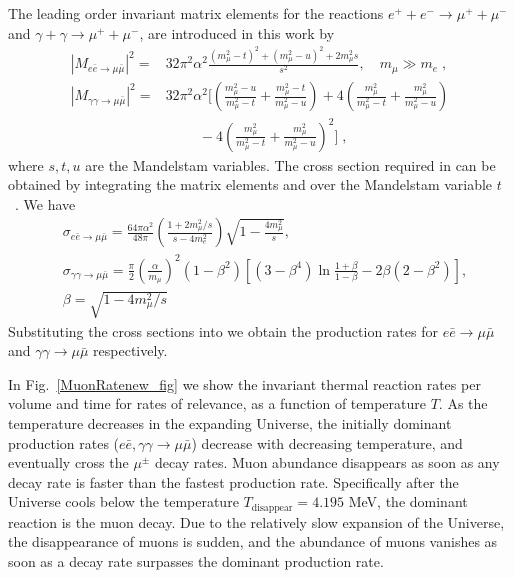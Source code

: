 The leading order invariant matrix elements for the reactions $e^++e^-\to\mu^++\mu^-$ and $\gamma+\gamma\to\mu^++\mu^-$, are introduced in this work by \cite{Kuznetsova:2008jt}
\begin{align}\label{Mee}
|M_{e\bar e\to\mu\bar\mu}|^2=&32\pi^2\alpha^2\frac{(m_\mu^2-t)^2+(m_\mu^2-u)^2+2m_\mu^2s}{s^2},\quad m_\mu\gg m_e\;,\\[0.2cm]
\label{Mgg}
|M_{\gamma\gamma\to\mu\bar\mu}|^2=&32\pi^2\alpha^2\bigg[\left(\frac{m_\mu^2-u}{m_\mu^2-t}+\frac{m_\mu^2-t}{m_\mu^2-u}\right)+4\left(\frac{m_\mu^2}{m_\mu^2-t}+\frac{m_\mu^2}{m^2_\mu-u}\right)\\[0.1cm]  \nonumber
&\hspace{1cm}-4\left(\frac{m_\mu^2}{m^2_\mu-t}+\frac{m^2_\mu}{m^2_\mu-u}\right)^2\bigg]\;,
\end{align}
 where $s, t, u$ are the Mandelstam variables. The cross section required in  can be obtained by integrating the matrix elements  and  over the Mandelstam variable $t$~\cite{Kuznetsova:2010pi}. We have
\begin{align}
&\sigma_{e\bar e\to\mu\bar\mu} 
=\frac{64\pi\alpha^2}{48\pi}\left(\frac{1+2m^2_\mu/s}{s-4m_e^2}\right)\sqrt{1-\frac{4m^2_\mu}{s}},\\
&\sigma_{\gamma\gamma\to\mu\bar\mu}=\frac{\pi}{2}\left(\frac{\alpha}{m_\mu}\right)^2(1-\beta^2)\left[(3-\beta^4)\ln\frac{1+\beta}{1-\beta}-2\beta(2-\beta^2)\right],\\
&\beta=\sqrt{1-4m^2_\mu/s}
\end{align}
Substituting the cross sections into  we obtain the production rates for $e\bar e\to\mu\bar\mu$ and $\gamma\gamma\to\mu\bar\mu$ respectively.

 
In Fig.~\ref{MuonRatenew_fig} we show the invariant thermal reaction rates per volume and time for rates of relevance, as a function of temperature $T$.
As the temperature decreases in the expanding Universe, the initially dominant production rates ($e\bar e,\gamma\gamma\to\mu\bar\mu$) decrease with decreasing temperature, and eventually cross the $\mu^\pm$ decay rates. 
Muon abundance disappears as soon as any decay rate is faster than the fastest production rate. Specifically after the Universe cools below the temperature $T_\mathrm{disappear}=4.195$ MeV, the dominant reaction is the muon decay. Due to the relatively slow expansion of the Universe, the disappearance of muons is sudden, and the abundance of muons vanishes as soon as a decay rate surpasses the dominant production rate.
 
